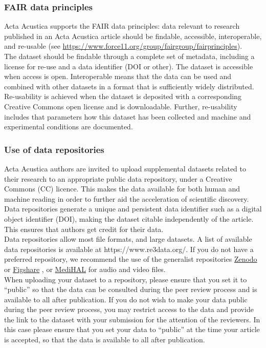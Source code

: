 \subsubsection{FAIR data principles }

Acta Acustica supports the FAIR data principles: data relevant to
research published in an Acta Acustica article should be findable,
accessible, interoperable, and re-usable (see \href{https://www.force11.org/group/fairgroup/fairprinciples}{https://www.force11.org/group/fairgroup/fairprinciples}).\\

The dataset should be findable through a complete set of metadata,
including a license for re-use and a data identifier (DOI or other).
The dataset is accessible when access is open. Interoperable means
that the data can be used and combined with other datasets in a format
that is sufficiently widely distributed. Re-usability is achieved
when the dataset is deposited with a corresponding Creative Commons
open license and is downloadable. Further, re-usability includes that
parameters how this dataset has been collected and machine and experimental
conditions are documented.

\subsubsection{Use of data repositories }

Acta Acustica authors are invited to upload supplemental datasets
related to their research to an appropriate public data repository,
under a Creative Commons (CC) licence. This makes the data available
for both human and machine reading in order to further aid the acceleration
of scientific discovery. Data repositories generate a unique and persistent
data identifier such as a digital object identifier (DOI), making
the dataset citable independently of the article. This ensures that
authors get credit for their data.\\

Data repositories allow most file formats, and large datasets. A list
of available data repositories is available at https://www.re3data.org/.
If you do not have a preferred repository, we recommend the use of
the generalist repositories \href{https://zenodo.org/}{Zenodo} or
\href{https://figshare.com/}{Figshare} , or \href{https://medihal.archives-ouvertes.fr/}{MediHAL}
for audio and video files.\\

When uploading your dataset to a repository, please ensure that you
set it to \textquotedblleft public\textquotedblright{} so that the
data can be consulted during the peer review process and is available
to all after publication. If you do not wish to make your data public
during the peer review process, you may restrict access to the data
and provide the link to the dataset with your submission for the attention
of the reviewers. In this case please ensure that you set your data
to \textquotedblleft public\textquotedblright{} at the time your article
is accepted, so that the data is available to all after publication.\\

